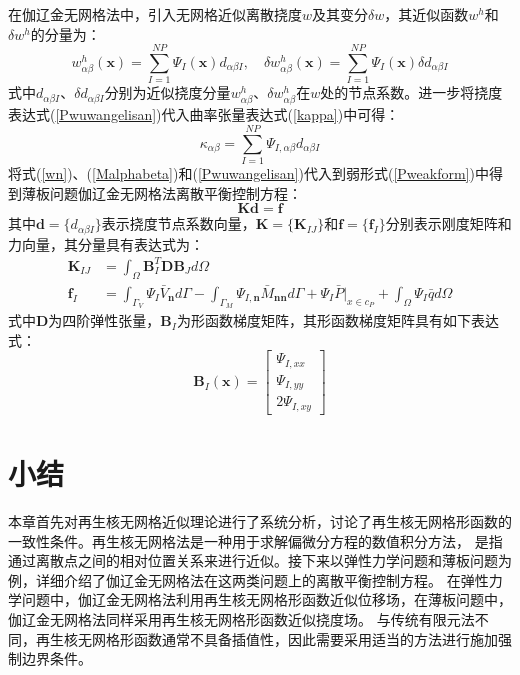 在伽辽金无网格法中，引入无网格近似离散挠度$w$及其变分$\delta w$，其近似函数$w^h$和$\delta w^h$的分量为：
\begin{equation}
\label{Pwuwangelisan}
    w_{\alpha\beta}^h(\pmb{x})=\sum_{I=1}^{N\!P}\Psi_I(\pmb{x})d_{\alpha\beta I},\quad \delta w_{\alpha\beta}^h(\pmb{x})=\sum_{I=1}^{N\!P}\Psi_I(\pmb{x})\delta d_{\alpha\beta I}
\end{equation}
式中$d_{\alpha\beta I}$、$\delta d_{\alpha\beta I}$分别为近似挠度分量$w_{\alpha\beta}^h$、$\delta w_{\alpha\beta}^h$在$w$处的节点系数。进一步将挠度表达式(\ref{Pwuwangelisan})代入曲率张量表达式(\ref{kappa})中可得：
\begin{equation}
\kappa_{\alpha\beta}=\sum_{I=1}^{N\!P}\Psi_{I,\alpha\beta}d_{\alpha\beta I}
\end{equation}
将式(\ref{wn})、(\ref{Malphabeta})和(\ref{Pwuwangelisan})代入到弱形式(\ref{Pweakform})中得到薄板问题伽辽金无网格法离散平衡控制方程：
\begin{equation}
     \pmb{K}\pmb{d}=\pmb{f}
\end{equation}
其中$\pmb{d}=\{d_{\alpha\beta I}\}$表示挠度节点系数向量，$\pmb{K}=\{\pmb{K}_{I\!J}\}$和$\pmb{f}=\{\pmb{f}_I\}$分别表示刚度矩阵和力向量，其分量具有表达式为：
\begin{subequations}\label{PKf}
\begin{align}
    \label{PKf1}\pmb K_{I\!J}&=\int_{\Omega}\pmb{B}^T_I\pmb{D}\pmb{B}_Jd\Omega\\
    \label{PKf2}\pmb f_I&=\int_{\Gamma_V}\Psi_I\bar{V}_{\pmb{n}}d\Gamma-\int_{\Gamma_M}\Psi_{I,\pmb{n}}\bar{M}_{\pmb{nn}}d\Gamma+\Psi_I\bar{P}\vert_{x\in c_P}+\int_{\Omega}\Psi_I\bar{q}d\Omega
\end{align}
\end{subequations}
式中$\pmb{D}$为四阶弹性张量，$\pmb{B}_I$为形函数梯度矩阵，其形函数梯度矩阵具有如下表达式：
\begin{equation}
\pmb{B}_I(\pmb{x})= \left[\begin{matrix}\Psi_{I,xx}\\\Psi_{I,yy}\\2\Psi_{I,xy}\end{matrix}\right] 
\end{equation}
\section{小结}
本章首先对再生核无网格近似理论进行了系统分析，讨论了再生核无网格形函数的一致性条件。再生核无网格法是一种用于求解偏微分方程的数值积分方法，
是指通过离散点之间的相对位置关系来进行近似。接下来以弹性力学问题和薄板问题为例，详细介绍了伽辽金无网格法在这两类问题上的离散平衡控制方程。
在弹性力学问题中，伽辽金无网格法利用再生核无网格形函数近似位移场，在薄板问题中，伽辽金无网格法同样采用再生核无网格形函数近似挠度场。
与传统有限元法不同，再生核无网格形函数通常不具备插值性，因此需要采用适当的方法进行施加强制边界条件。
